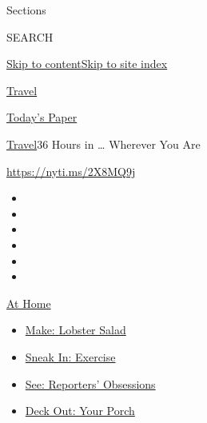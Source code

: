 Sections

SEARCH

\protect\hyperlink{site-content}{Skip to
content}\protect\hyperlink{site-index}{Skip to site index}

\href{https://www.nytimes3xbfgragh.onion/section/travel}{Travel}

\href{https://myaccount.nytimes3xbfgragh.onion/auth/login?response_type=cookie\&client_id=vi}{}

\href{https://www.nytimes3xbfgragh.onion/section/todayspaper}{Today's
Paper}

\href{/section/travel}{Travel}\textbar{}36 Hours in \ldots{} Wherever
You Are

\url{https://nyti.ms/2X8MQ9j}

\begin{itemize}
\item
\item
\item
\item
\item
\item
\end{itemize}

\href{https://www.nytimes3xbfgragh.onion/spotlight/at-home?action=click\&pgtype=Article\&state=default\&region=TOP_BANNER\&context=at_home_menu}{At
Home}

\begin{itemize}
\tightlist
\item
  \href{https://www.nytimes3xbfgragh.onion/2020/08/14/dining/lobster-salad-recipe.html?action=click\&pgtype=Article\&state=default\&region=TOP_BANNER\&context=at_home_menu}{Make:
  Lobster Salad}
\item
  \href{https://www.nytimes3xbfgragh.onion/2020/08/15/at-home/coronavirus-at-home-quick-exercises.html?action=click\&pgtype=Article\&state=default\&region=TOP_BANNER\&context=at_home_menu}{Sneak
  In: Exercise}
\item
  \href{https://www.nytimes3xbfgragh.onion/interactive/2020/at-home/even-more-reporters-editors-diaries-lists-recommendations.html?action=click\&pgtype=Article\&state=default\&region=TOP_BANNER\&context=at_home_menu}{See:
  Reporters' Obsessions}
\item
  \href{https://www.nytimes3xbfgragh.onion/2020/08/15/at-home/coronavirus-fall-patio-furniture.html?action=click\&pgtype=Article\&state=default\&region=TOP_BANNER\&context=at_home_menu}{Deck
  Out: Your Porch}
\end{itemize}

